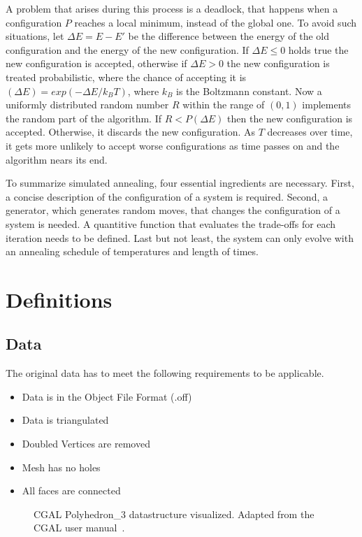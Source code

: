 \documentclass[draft,final]{vutinfth} %
\begin{document}
A problem that arises during this process is a deadlock, that happens when a configuration $P$ reaches a local minimum, instead of the global one. To avoid such situations, let $\Delta E = E - E'$ be the difference between the energy of the old configuration and the energy of the new configuration. If $\Delta E \leq 0$ holds true  the new configuration is accepted, otherwise if $\Delta E > 0$ the new configuration is treated probabilistic, where the chance of accepting it is $(\Delta E) = exp(-\Delta E / k_B T)$, where $k_B$ is the Boltzmann constant. Now a uniformly distributed random number $R$ within the range of $(0,1)$ implements the random part of the algorithm. If $R < P(\Delta E)$ then the new configuration is accepted. Otherwise, it discards the new configuration. As $T$ decreases over time, it gets more unlikely to accept worse configurations as time passes on and the algorithm nears its end.

To summarize simulated annealing, four essential ingredients are necessary. First, a concise description of the configuration of a system is required. Second, a generator, which generates random moves, that changes the configuration of a system is needed. A quantitive function that evaluates the trade-offs for each iteration needs to be defined. Last but not least, the system can only evolve with an annealing schedule of temperatures and length of times.
\chapter{Definitions}
\label{chap:definitions}

\section{Data}

The original data has to meet the following requirements to be applicable.

\begin{itemize}
	\item Data is in the Object File Format (.off)
	\item Data is triangulated
	\item Doubled Vertices are removed
	\item Mesh has no holes
	\item All faces are connected
\end{itemize}

\begin{figure}

\caption{CGAL Polyhedron\_3 datastructure visualized. Adapted from the CGAL user manual~\cite{cgal:eb-19a}.}
\label{fig:cgal}
\end{figure}
\end{document}
